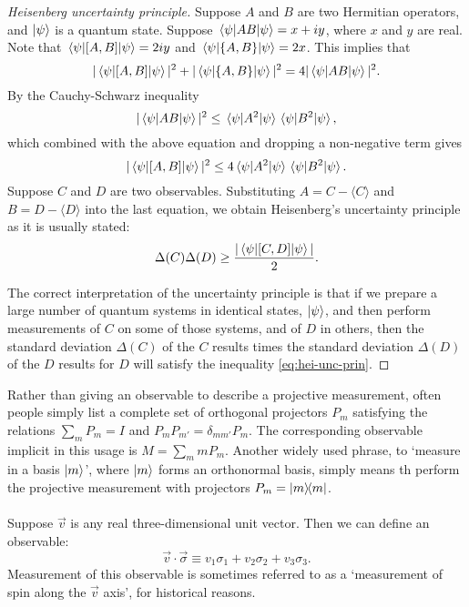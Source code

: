 \begin{proof}[Heisenberg uncertainty principle]
  Suppose $A$ and $B$ are two Hermitian operators, and $\ket{\psi}$ is a
  quantum state. Suppose $\mel{\psi}{AB}{\psi} = x + iy$, where $x$ and $y$ are
  real. Note that $\mel{\psi}{[A, B]}{\psi} = 2iy$ and $\mel{\psi}{\{A, B\}}
  {\psi} = 2x$. This implies that \begin{equation*}
    |\mel{\psi}{[A, B]}{\psi}|^2 + |\mel{\psi}{\{A, B\}}{\psi}|^2 =
    4|\mel{\psi}{AB}{\psi}|^2.
  \end{equation*} By the Cauchy-Schwarz inequality \begin{equation*}
    |\mel{\psi}{AB}{\psi}|^2 \leq \mel{\psi}{A^2}{\psi}\mel{\psi}{B^2}{\psi},
  \end{equation*} which combined with the above equation and dropping a
  non-negative term gives \begin{equation*}
    |\mel{\psi}{[A, B]}{\psi}|^2 \leq 4\mel{\psi}{A^2}{\psi}
    \mel{\psi}{B^2}{\psi}.
  \end{equation*} Suppose $C$ and $D$ are two observables. Substituting $A = C
  - \langle C \rangle$ and $B = D - \langle D \rangle$ into the last equation,
  we obtain Heisenberg's uncertainty principle as it is usually stated:
  \begin{equation*}
    \Delta(C)\Delta(D) \geq \frac{|\mel{\psi}{[C, D]}{\psi}|}{2}.
    \label{eq:hei-unc-prin}
  \end{equation*}

  The correct interpretation of the uncertainty principle is that if we prepare
  a large number of quantum systems in identical states, $\ket{\psi}$, and then
  perform measurements of $C$ on some of those systems, and of $D$ in others,
  then the standard deviation $\Delta(C)$ of the $C$ results times the standard
  deviation $\Delta(D)$ of the $D$ results for $D$ will satisfy the inequality
  \eqref{eq:hei-unc-prin}.
\end{proof}

Rather than giving an observable to describe a projective measurement, often
people simply list a complete set of orthogonal projectors $P_m$ satisfying the
relations $\sum_m P_m = I$ and $P_mP_{m'} = \delta_{mm'}P_m$. The corresponding
observable implicit in this usage is $M = \sum_m mP_m$. Another widely used
phrase, to `measure in a basis $\ket{m}$', where $\ket{m}$ forms an orthonormal
basis, simply means th perform the projective measurement with projectors $P_m
= \ketbra{m}{m}$.

\paragraph{} Suppose $\vec{v}$ is any real three-dimensional unit vector. Then
we can define an observable: \begin{equation*}
  \vec{v} \cdot \vec{\sigma} \equiv v_1\sigma_1 + v_2\sigma_2 + v_3\sigma_3.
\end{equation*} Measurement of this observable is sometimes referred to as a
`measurement of spin along the $\vec{v}$ axis', for historical reasons.

